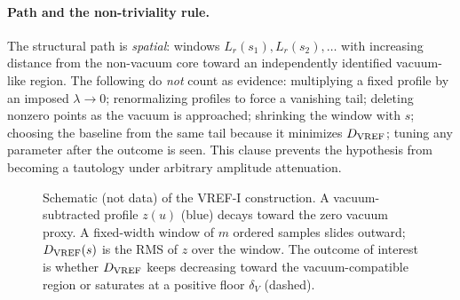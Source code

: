 \documentclass[11pt,a4paper]{article}
\theoremstyle{definition}
\theoremstyle{remark}
\begin{document}
\paragraph{Path and the non-triviality rule.} The structural path is \emph{spatial}: windows $L_r(s_1),L_r(s_2),\dots$ with increasing distance from the non-vacuum core toward an independently identified vacuum-like region. The following do \emph{not} count as evidence: multiplying a fixed profile by an imposed $\lambda\to0$; renormalizing profiles to force a vanishing tail; deleting nonzero points as the vacuum is approached; shrinking the window with $s$; choosing the baseline from the same tail because it minimizes $D_{\rm VREF}$; tuning any parameter after the outcome is seen. This clause prevents the hypothesis from becoming a tautology under arbitrary amplitude attenuation.

\begin{figure}[t]
\centering
{}
\caption{Schematic (not data) of the VREF-I construction. A vacuum-subtracted profile $z(u)$ (blue) decays toward the zero vacuum proxy. A fixed-width window of $m$ ordered samples slides outward; $D_{\rm VREF}(s)$ is the RMS of $z$ over the window. The outcome of interest is whether $D_{\rm VREF}$ keeps decreasing toward the vacuum-compatible region or saturates at a positive floor $\delta_V$ (dashed).}\label{fig:vref}
\end{figure}
\end{document}

